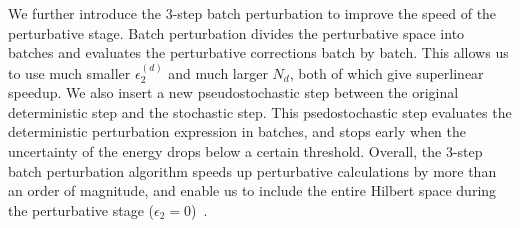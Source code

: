 We further introduce the 3-step batch perturbation to improve the speed of the perturbative stage.
Batch perturbation divides the perturbative space into batches and evaluates the perturbative corrections batch by batch.
This allows us to use much smaller $\epsilon_2^{(d)}$ and much larger $N_d$, both of which give superlinear speedup.
We also insert a new pseudostochastic step between the original deterministic step and the stochastic step.
This psedostochastic step evaluates the deterministic perturbation expression in batches, and stops early when the uncertainty of the energy drops below a certain threshold.
Overall, the 3-step batch perturbation algorithm speeds up perturbative calculations by more than an order of magnitude, and enable us to include the entire Hilbert space during the perturbative stage ($\epsilon_2=0$)~\cite{li2018fast}.